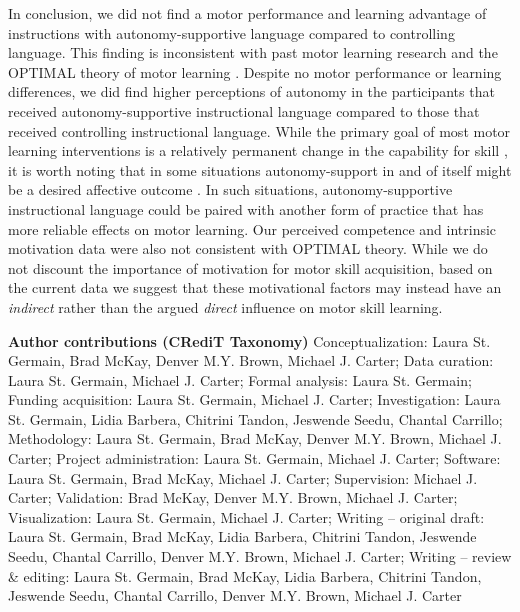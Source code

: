\documentclass[man,floatsintext,donotrepeattitle,letterpaper,12pt]{apa7}
\begin{document}
In conclusion, we did not find a motor performance and learning advantage of instructions with autonomy-supportive language compared to controlling language. This finding is inconsistent with past motor learning research \autocite[e.g.,][]{hooyman2014} and the OPTIMAL theory of motor learning \autocite{wulf2016}. Despite no motor performance or learning differences, we did find higher perceptions of autonomy in the participants that received autonomy-supportive instructional language compared to those that received controlling instructional language. While the primary goal of most motor learning interventions is a relatively permanent change in the capability for skill \autocite{schmidt2019}, it is worth noting that in some situations autonomy-support in and of itself might be a desired affective outcome \autocite[e.g.,][]{stemarie2020a}. In such situations, autonomy-supportive instructional language could be paired with another form of practice that has more reliable effects on motor learning. Our perceived competence and intrinsic motivation data were also not consistent with OPTIMAL theory. While we do not discount the importance of motivation for motor skill acquisition, based on the current data we suggest that these motivational factors may instead have an \emph{indirect} \autocite[e.g.,][]{salmoni1984} rather than the argued \emph{direct} \autocite[e.g.,][]{wulf2016} influence on motor skill learning.

\clearpage

\noindent \textbf{Author contributions (CRediT Taxonomy)} \hspace{0.25em} Conceptualization: Laura St. Germain, Brad McKay, Denver M.Y. Brown, Michael J. Carter; Data curation: Laura St. Germain, Michael J. Carter; Formal analysis: Laura St. Germain; Funding acquisition: Laura St. Germain, Michael J. Carter; Investigation: Laura St. Germain, Lidia Barbera, Chitrini Tandon, Jeswende Seedu, Chantal Carrillo; Methodology: Laura St. Germain, Brad McKay, Denver M.Y. Brown, Michael J. Carter; Project administration: Laura St. Germain, Michael J. Carter; Software: Laura St. Germain, Brad McKay, Michael J. Carter; Supervision: Michael J. Carter; Validation: Brad McKay, Denver M.Y. Brown, Michael J. Carter; Visualization: Laura St. Germain, Michael J. Carter; Writing -- original draft: Laura St. Germain, Brad McKay, Lidia Barbera, Chitrini Tandon, Jeswende Seedu, Chantal Carrillo, Denver M.Y. Brown, Michael J. Carter; Writing -- review \& editing: Laura St. Germain, Brad McKay, Lidia Barbera, Chitrini Tandon, Jeswende Seedu, Chantal Carrillo, Denver M.Y. Brown, Michael J. Carter
\end{document}
